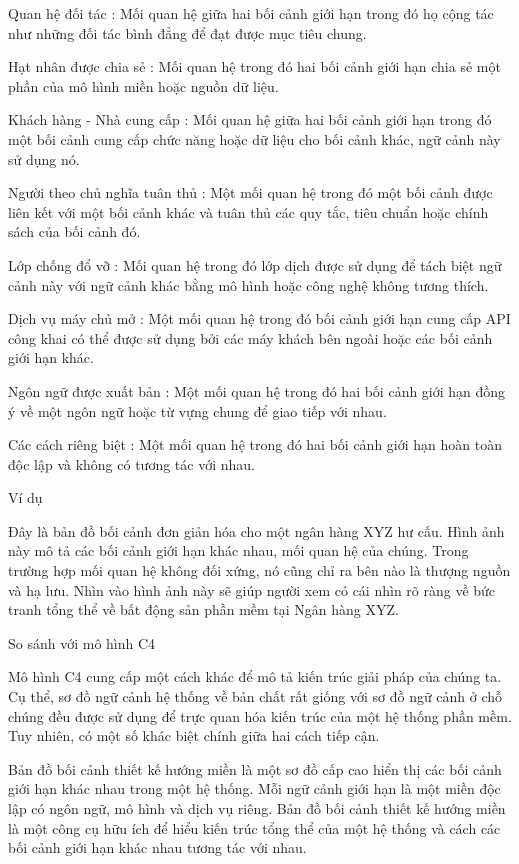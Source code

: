 Quan hệ đối tác : Mối quan hệ giữa hai bối cảnh giới hạn trong đó họ cộng tác như những đối tác bình đẳng để đạt được mục tiêu chung.

Hạt nhân được chia sẻ : Mối quan hệ trong đó hai bối cảnh giới hạn chia sẻ một phần của mô hình miền hoặc nguồn dữ liệu.

Khách hàng - Nhà cung cấp : Mối quan hệ giữa hai bối cảnh giới hạn trong đó một bối cảnh cung cấp chức năng hoặc dữ liệu cho bối cảnh khác, ngữ cảnh này sử dụng nó.

Người theo chủ nghĩa tuân thủ : Một mối quan hệ trong đó một bối cảnh được liên kết với một bối cảnh khác và tuân thủ các quy tắc, tiêu chuẩn hoặc chính sách của bối cảnh đó.

Lớp chống đổ vỡ : Mối quan hệ trong đó lớp dịch được sử dụng để tách biệt ngữ cảnh này với ngữ cảnh khác bằng mô hình hoặc công nghệ không tương thích.

Dịch vụ máy chủ mở : Một mối quan hệ trong đó bối cảnh giới hạn cung cấp API công khai có thể được sử dụng bởi các máy khách bên ngoài hoặc các bối cảnh giới hạn khác.

Ngôn ngữ được xuất bản : Một mối quan hệ trong đó hai bối cảnh giới hạn đồng ý về một ngôn ngữ hoặc từ vựng chung để giao tiếp với nhau.

Các cách riêng biệt : Một mối quan hệ trong đó hai bối cảnh giới hạn hoàn toàn độc lập và không có tương tác với nhau.

Ví dụ

Đây là bản đồ bối cảnh đơn giản hóa cho một ngân hàng XYZ hư cấu. Hình ảnh này mô tả các bối cảnh giới hạn khác nhau, mối quan hệ của chúng. Trong trường hợp mối quan hệ không đối xứng, nó cũng chỉ ra bên nào là thượng nguồn và hạ lưu. Nhìn vào hình ảnh này sẽ giúp người xem có cái nhìn rõ ràng về bức tranh tổng thể về bất động sản phần mềm tại Ngân hàng XYZ.

So sánh với mô hình C4

Mô hình C4 cung cấp một cách khác để mô tả kiến trúc giải pháp của chúng ta. Cụ thể, sơ đồ ngữ cảnh hệ thống về bản chất rất giống với sơ đồ ngữ cảnh ở chỗ chúng đều được sử dụng để trực quan hóa kiến trúc của một hệ thống phần mềm. Tuy nhiên, có một số khác biệt chính giữa hai cách tiếp cận.

Bản đồ bối cảnh thiết kế hướng miền là một sơ đồ cấp cao hiển thị các bối cảnh giới hạn khác nhau trong một hệ thống. Mỗi ngữ cảnh giới hạn là một miền độc lập có ngôn ngữ, mô hình và dịch vụ riêng. Bản đồ bối cảnh thiết kế hướng miền là một công cụ hữu ích để hiểu kiến trúc tổng thể của một hệ thống và cách các bối cảnh giới hạn khác nhau tương tác với nhau.

